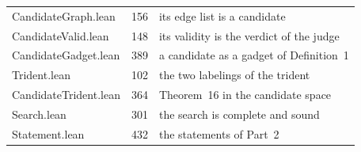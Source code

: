 \documentclass[11pt,a4paper]{article}
\newcommand{\leanus}{\textunderscore\allowbreak}
\newcommand{\lean}[1]{{\ttfamily\let\_\leanus #1}}
\begin{document}
\begin{center}
\begin{tabular}{@{}lrp{}@{}}
\lean{CandidateGraph.lean} & 156 & its edge list is a candidate\\
\lean{CandidateValid.lean} & 148 & its validity is the verdict of the judge\\
\lean{CandidateGadget.lean} & 389 & a candidate as a gadget of Definition~1\\
\lean{Trident.lean} & 102 & the two labelings of the trident\\
\lean{CandidateTrident.lean} & 364 & Theorem~16 in the candidate space\\
\lean{Search.lean} & 301 & the search is complete and sound\\
\lean{Statement.lean} & 432 & the statements of Part~2\\
\bottomrule
\end{tabular}
\end{center}
\end{document}
